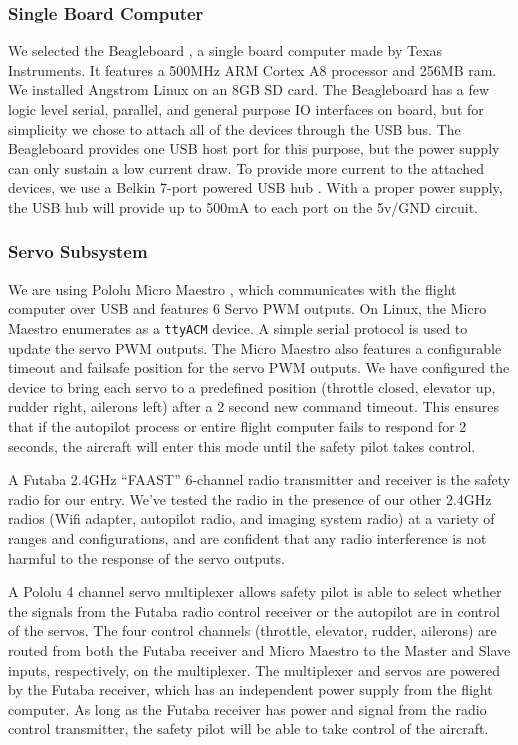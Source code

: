 \documentclass[pdftex,10pt,letter]{article}
\begin{document}
\subsubsection{Single Board Computer}
We selected the Beagleboard \cite{beagleboard}, a single board computer made by Texas Instruments. It features a 500MHz ARM Cortex A8 processor and 256MB ram. We installed Angstrom Linux \cite{angstromlinux} on an 8GB SD card. The Beagleboard has a few logic level serial, parallel, and general purpose IO interfaces on board, but for simplicity we chose to attach all of the devices through the USB bus. The Beagleboard provides one USB host port for this purpose, but the power supply can only sustain a low current draw. To provide more current to the attached devices, we use a Belkin 7-port powered USB hub \cite{belkin7usbhub}. With a proper power supply, the USB hub will provide up to 500mA to each port on the 5v/GND circuit.

\subsubsection{Servo Subsystem}
We are using Pololu Micro Maestro \cite{micromaestro}, which communicates with the flight computer over USB and features 6 Servo PWM outputs. On Linux, the Micro Maestro enumerates as a \texttt{ttyACM} device. A simple serial protocol is used to update the servo PWM outputs. The Micro Maestro also features a configurable timeout and failsafe position for the servo PWM outputs. We have configured the device to bring each servo to a predefined position (throttle closed, elevator up, rudder right, ailerons left) after a 2 second new command timeout. This ensures that if the autopilot process or entire flight computer fails to respond for 2 seconds, the aircraft will enter this mode until the safety pilot takes control.

A Futaba 2.4GHz ``FAAST'' 6-channel radio transmitter and receiver \cite{futaba24} is the safety radio for our entry. We've tested the radio in the presence of our other 2.4GHz radios (Wifi adapter, autopilot radio, and imaging system radio) at a variety of ranges and configurations, and are confident that any radio interference is not harmful to the response of the servo outputs.

A Pololu 4 channel servo multiplexer \cite{pololumux} allows safety pilot is able to select whether the signals from the Futaba radio control receiver or the autopilot are in control of the servos. The four control channels (throttle, elevator, rudder, ailerons) are routed from both the Futaba receiver and Micro Maestro to the Master and Slave inputs, respectively, on the multiplexer. The multiplexer and servos are powered by the Futaba receiver, which has an independent power supply from the flight computer. As long as the Futaba receiver has power and signal from the radio control transmitter, the safety pilot will be able to take control of the aircraft.
\end{document}
